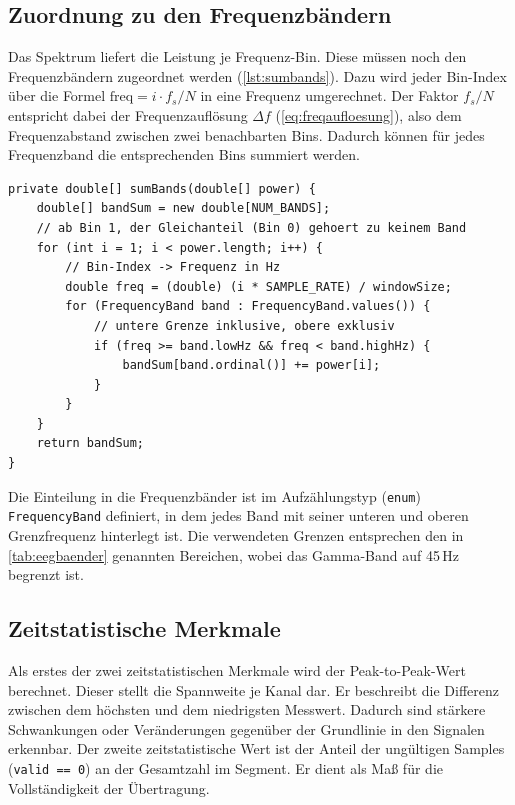 \subsection{Zuordnung zu den Frequenzbändern} Das Spektrum liefert die Leistung je Frequenz-Bin. Diese müssen noch den Frequenzbändern zugeordnet werden (\autoref{lst:sumbands}). Dazu wird jeder Bin-Index über die Formel \(\text{freq} = i \cdot f_s / N\) in eine Frequenz umgerechnet. Der Faktor \(f_s / N\) entspricht dabei der Frequenzauflösung \(\Delta f\) (\autoref{eq:freqaufloesung}), also dem Frequenzabstand zwischen zwei benachbarten Bins. Dadurch können für jedes Frequenzband die entsprechenden Bins summiert werden.
\begin{lstlisting}[style=code, caption={[Zuordnung zu den Bändern]Zuordnung der Frequenz-Bins zu den Bändern. Jeder Bin-Index wird in eine Frequenz umgerechnet und dem passenden Band zugeordnet.}, label={lst:sumbands}]
private double[] sumBands(double[] power) {
    double[] bandSum = new double[NUM_BANDS];
    // ab Bin 1, der Gleichanteil (Bin 0) gehoert zu keinem Band
    for (int i = 1; i < power.length; i++) {
        // Bin-Index -> Frequenz in Hz
        double freq = (double) (i * SAMPLE_RATE) / windowSize;
        for (FrequencyBand band : FrequencyBand.values()) {
            // untere Grenze inklusive, obere exklusiv
            if (freq >= band.lowHz && freq < band.highHz) {
                bandSum[band.ordinal()] += power[i];
            }
        }
    }
    return bandSum;
}
\end{lstlisting}

\noindent Die Einteilung in die Frequenzbänder ist im Aufzählungstyp (\texttt{enum}) \texttt{FrequencyBand} definiert, in dem jedes Band mit seiner unteren und oberen Grenzfrequenz hinterlegt ist. Die verwendeten Grenzen entsprechen den in \autoref{tab:eegbaender} genannten Bereichen, wobei das Gamma-Band auf 45\,Hz begrenzt ist.

\subsection{Zeitstatistische Merkmale} Als erstes der zwei zeitstatistischen Merkmale wird der Peak-to-Peak-Wert berechnet. Dieser stellt die Spannweite je Kanal dar. Er beschreibt die Differenz zwischen dem höchsten und dem niedrigsten Messwert. Dadurch sind stärkere Schwankungen oder Veränderungen gegenüber der Grundlinie in den Signalen erkennbar. Der zweite zeitstatistische Wert ist der Anteil der ungültigen Samples (\texttt{valid == 0}) an der Gesamtzahl im Segment. Er dient als Maß für die Vollständigkeit der Übertragung.
\vspace{\baselineskip}

